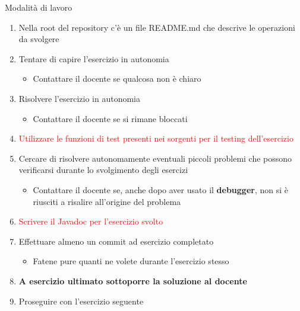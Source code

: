 \documentclass[presentation]{beamer}
\begin{document}
\begin{frame}{Modalità di lavoro}
	\begin{enumerate}
		\item Nella root del repository c'è un file README.md che descrive le operazioni da svolgere
		\item Tentare di capire l'esercizio in autonomia
		\begin{itemize}
			\item Contattare il docente se qualcosa non è chiaro
		\end{itemize}
		\item Risolvere l'esercizio in autonomia
		\begin{itemize}
			\item Contattare il docente se si rimane bloccati
		\end{itemize}
		\item \textcolor{red}{Utilizzare le funzioni di test presenti nei sorgenti per il testing dell'esercizio}
		\item Cercare di risolvere autonomamente eventuali piccoli problemi che possono verificarsi durante lo svolgimento degli esercizi
		\begin{itemize}
			\item Contattare il docente se, anche dopo aver usato il \textbf{debugger}, non si è riusciti a risalire all'origine del problema
		\end{itemize}
		\item \textcolor{red}{Scrivere il Javadoc per l'esercizio svolto}
		\item Effettuare almeno un commit ad esercizio completato
		\begin{itemize}
			\item Fatene pure quanti ne volete durante l'esercizio stesso
		\end{itemize}
		\item \textbf{A esercizio ultimato sottoporre la soluzione al docente}
		\item Proseguire con l'esercizio seguente
	\end{enumerate}
\end{frame}
\end{document}
